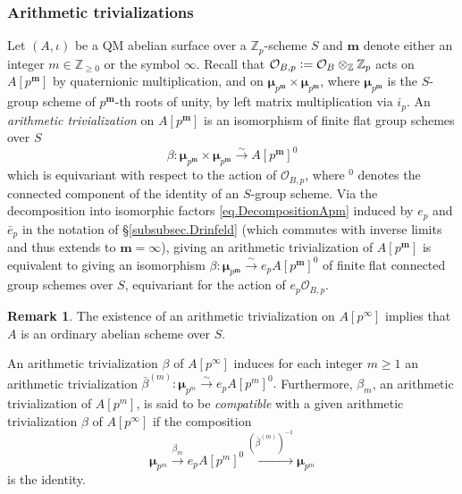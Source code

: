 \documentclass[a4paper]{amsart}
\makeatletter
\numberwithin{equation}{section}
\newcommand{\smallbullet}{}
\DeclareRobustCommand\smallbullet{
  \mathord{\mathpalette\smallbullet@{0.5}}
}
\newcommand{\smallbullet@}[2]{
  \vcenter{\hbox{\scalebox{#2}{$\m@th#1\bullet$}}}
}
\theoremstyle{definition}
\newtheorem{remark}[theorem]{Remark}
\newcommand{\Z}{\mathbb{Z}}
\newcommand{\defeq}{\vcentcolon=}
\makeatother
\begin{document}
\subsubsection{Arithmetic trivializations}
Let $(A,\iota)$ be a QM abelian surface over a $\Z_p$-scheme $S$ and $\mathbf{m}$ denote either an integer $m\in\Z_{\ge0}$ or the symbol $\infty$. Recall that $\mathcal{O}_{B,p}\defeq\mathcal{O}_B\otimes_{\Z}\Z_p$ acts on $A[p^{\mathbf{m}}]$ by quaternionic multiplication, and on $\boldsymbol{\mu}_{p^\mathbf{m}}\times\boldsymbol{\mu}_{p^\mathbf{m}}$, where $\boldsymbol{\mu}_{p^\mathbf{m}}$ is the $S$-group scheme of $p^\mathbf{m}$-th roots of unity, by left matrix multiplication via $i_p$. An \emph{arithmetic trivialization} on $A[p^{\mathbf{m}}]$ is an isomorphism of finite flat group schemes over $S$ \[\beta\colon\boldsymbol{\mu}_{p^{\mathbf{m}}}\times \boldsymbol{\mu}_{p^{\mathbf{m}}}\stackrel{\sim}{\longrightarrow} A[p^{\mathbf{m}}]^0\]
which is equivariant with respect to the action of $\mathcal{O}_{B,p}$, where $\smallbullet^0$ denotes the connected component of the identity of an $S$-group scheme. Via the decomposition into isomorphic factors \eqref{eq.DecompositionApm} induced by $e_p$ and $\bar{e}_p$ in the notation of \S\ref{subsubsec.Drinfeld} (which commutes with inverse limits and thus extends to ${\mathbf{m}}=\infty$), giving an arithmetic trivialization of $A[p^{\mathbf{m}}]$ is equivalent to giving an isomorphism 
$\beta\colon\boldsymbol{\mu}_{p^{\mathbf{m}}} \stackrel{\sim}{\rightarrow} e_pA[p^{\mathbf{m}}]^0$ of finite flat connected group schemes over $S$, equivariant for the action of $e_p\mathcal{O}_{B,p}$.

\begin{remark}\label{rem.OrdinaryReduction}
The existence of an arithmetic trivialization on $A[p^\infty]$ implies that $A$ is an ordinary abelian scheme over $S$.
\end{remark}

An arithmetic trivialization $\beta$ of $A[p^\infty]$ induces for each integer $m\geq 1$ an arithmetic trivialization
$\bar\beta^{(m)} \colon\boldsymbol{\mu}_{p^m}\stackrel{\sim}{\rightarrow} e_pA[p^m]^0.$ Furthermore, $\beta_m$, an arithmetic trivialization of $A[p^m]$, is said to be \emph{compatible} with a given arithmetic trivialization $\beta$ of $A[p^\infty]$ if the composition 
\[\boldsymbol{\mu}_{p^m}\overset{\beta_{m} }\longrightarrow 
e_pA[p^m]^0\overset{(\bar\beta^{(m)})^{-1}}\longrightarrow\boldsymbol{\mu}_{p^m}\] is the identity.
\end{document}
